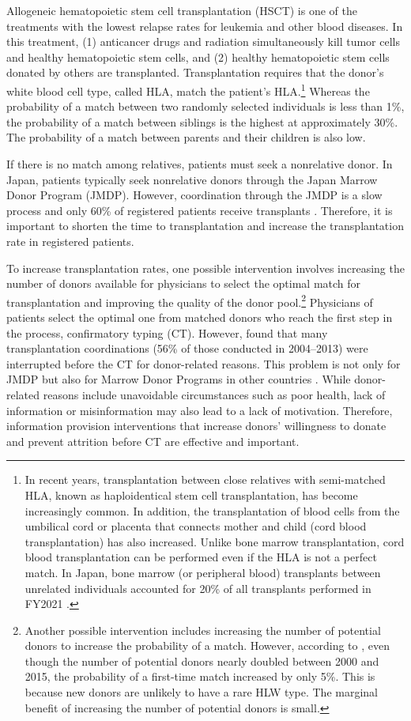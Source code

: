 \documentclass[12pt, a4paper]{article}
\begin{document}
Allogeneic hematopoietic stem cell transplantation (HSCT) is one of the treatments with the lowest relapse rates for leukemia and other blood diseases. In this treatment, (1) anticancer drugs and radiation simultaneously kill tumor cells and healthy hematopoietic stem cells, and (2) healthy hematopoietic stem cells donated by others are transplanted. Transplantation requires that the donor's white blood cell type, called HLA, match the patient's HLA.\footnote{In recent years, transplantation between close relatives with semi-matched HLA, known as haploidentical stem cell transplantation, has become increasingly common. In addition, the transplantation of blood cells from the umbilical cord or placenta that connects mother and child (cord blood transplantation) has also increased. Unlike bone marrow transplantation, cord blood transplantation can be performed even if the HLA is not a perfect match. In Japan, bone marrow (or peripheral blood) transplants between unrelated individuals accounted for 20\% of all transplants performed in FY2021 \citep{JapaneseDataCenterf2022}.} Whereas the probability of a match between two randomly selected individuals is less than 1\%, the probability of a match between siblings is the highest at approximately 30\%. The probability of a match between parents and their children is also low.

If there is no match among relatives, patients must seek a nonrelative donor. In Japan, patients typically seek nonrelative donors through the Japan Marrow Donor Program (JMDP). However, coordination through the JMDP is a slow process and only 60\% of registered patients receive transplants \citep{Hirakawa2018}. Therefore, it is important to shorten the time to transplantation and increase the transplantation rate in registered patients.

To increase transplantation rates, one possible intervention involves increasing the number of donors available for physicians to select the optimal match for transplantation and improving the quality of the donor pool.\footnote{Another possible intervention includes increasing the number of potential donors to increase the probability of a match. However, according to \citet{Takanashi2016}, even though the number of potential donors nearly doubled between 2000 and 2015, the probability of a first-time match increased by only 5\%. This is because new donors are unlikely to have a rare HLW type. The marginal benefit of increasing the number of potential donors is small.} Physicians of patients select the optimal one from matched donors who reach the first step in the process, confirmatory typing (CT). However, \citet{Hirakawa2018} found that many transplantation coordinations (56\% of those conducted in 2004--2013) were interrupted before the CT for donor-related reasons. This problem is not only for JMDP but also for Marrow Donor Programs in other countries \citep{Haylock2024}. While donor-related reasons include unavoidable circumstances such as poor health, lack of information or misinformation may also lead to a lack of motivation. Therefore, information provision interventions that increase donors' willingness to donate and prevent attrition before CT are effective and important.
\end{document}
